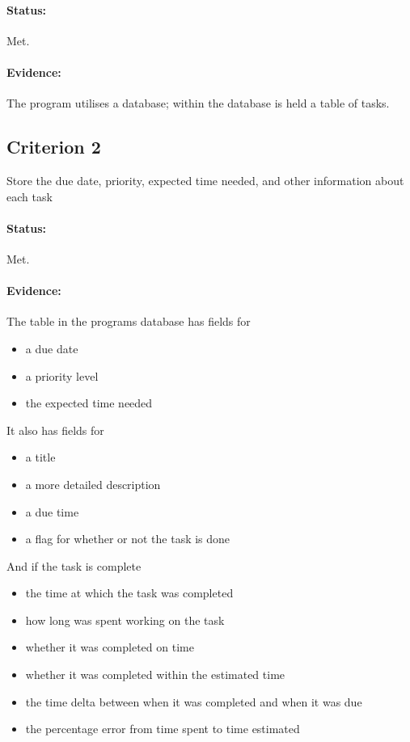 \documentclass{article}
\begin{document}
\paragraph{Status:}
Met.

\paragraph{Evidence:}
The program utilises a database;
within the database is held a table of tasks.

\subsection*{Criterion 2}
Store the due date, priority, expected time needed, and other information about each task

\paragraph{Status:}
Met.
\paragraph{Evidence:}
The table in the programs database has fields for
\begin{samepage}
	\begin{itemize}
		\item a due date
		\item a priority level
		\item the expected time needed
	\end{itemize}
\end{samepage}

It also has fields for
\begin{samepage}
	\begin{itemize}
		\item a title
		\item a more detailed description
		\item a due time
		\item a flag for whether or not the task is done
	\end{itemize}
\end{samepage}

And if the task is complete
\begin{samepage}
	\begin{itemize}
		\item the time at which the task was completed
		\item how long was spent working on the task
		\item whether it was completed on time
		\item whether it was completed within the estimated time
		\item the time delta between when it was completed and when it was due
		\item the percentage error from time spent to time estimated
	\end{itemize}
\end{samepage}
\end{document}
